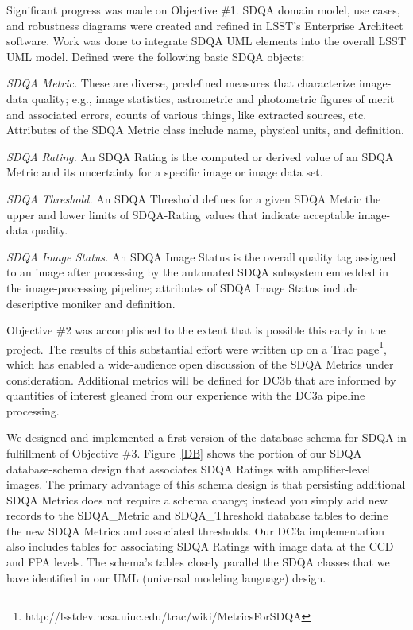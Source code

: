 Significant progress was made on Objective \#1.  SDQA domain model, use cases, 
and robustness diagrams were created and refined in LSST's Enterprise Architect 
software.  Work was done to integrate SDQA UML elements into the overall LSST
UML model.  Defined were the following basic SDQA objects:

\begin{description}
\item{\it SDQA Metric.}
These are diverse, predefined measures that characterize image-data quality; 
e.g., image statistics, astrometric and photometric figures of merit and associated 
errors, counts of various things, like extracted sources, etc.  Attributes of the
SDQA Metric class include name, physical units, and definition.  
\item{\it SDQA Rating.}
An SDQA Rating is 
the computed or derived value of an SDQA Metric and its uncertainty for a specific
image or image data set.  
\item{\it SDQA Threshold.}
An SDQA Threshold defines for a given SDQA Metric the 
upper and lower limits of SDQA-Rating values that indicate acceptable image-data 
quality.  \item{\it SDQA Image Status.}
An SDQA Image Status is the overall quality tag assigned to an image
after processing by the automated SDQA subsystem embedded in the image-processing
pipeline; attributes of SDQA Image Status include descriptive moniker and definition.
\end{description}

Objective \#2 was accomplished to the extent that is possible this early in the 
project.  The results of this substantial effort were written up on a Trac 
page\footnote{http://lsstdev.ncsa.uiuc.edu/trac/wiki/MetricsForSDQA}, which has 
enabled a wide-audience open discussion of the SDQA Metrics under consideration.
Additional metrics will be defined for DC3b that are informed by quantities of interest 
gleaned from our experience with the DC3a pipeline processing.

We designed and implemented a first version of the database schema for SDQA in fulfillment
of Objective \#3.  Figure~\ref{DB} shows the portion of our SDQA database-schema design
that associates SDQA Ratings with amplifier-level images.  
The primary advantage of this schema design is that persisting additional SDQA Metrics
does not require a schema change; instead you simply add new records to the SDQA\_Metric
and SDQA\_Threshold database tables to define the new SDQA Metrics and associated thresholds.
Our DC3a implementation also
includes tables for associating SDQA Ratings with image data at the CCD and FPA levels.
The schema's tables closely parallel the SDQA classes that we have identified in our UML (universal modeling language) design.

